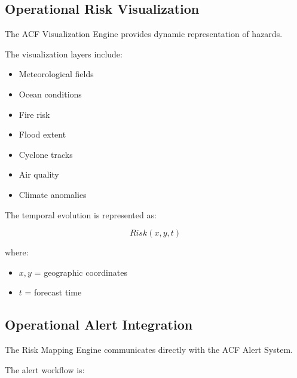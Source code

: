 
\subsection{Operational Risk Visualization}

The ACF Visualization Engine provides dynamic representation of hazards.

The visualization layers include:

\begin{itemize}

\item Meteorological fields

\item Ocean conditions

\item Fire risk

\item Flood extent

\item Cyclone tracks

\item Air quality

\item Climate anomalies

\end{itemize}


The temporal evolution is represented as:

\[
Risk(x,y,t)
\]


where:

\begin{itemize}

\item $x,y$ = geographic coordinates

\item $t$ = forecast time

\end{itemize}



\subsection{Operational Alert Integration}

The Risk Mapping Engine communicates directly with the ACF Alert System.

The alert workflow is:

